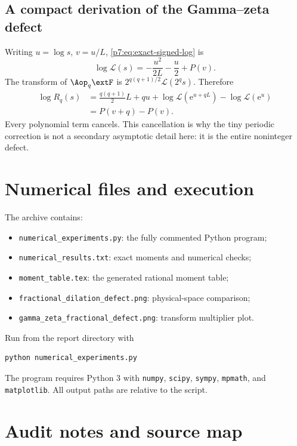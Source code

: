 \documentclass[11pt,oneside]{article}
\theoremstyle{definition}
\theoremstyle{remark}
\newcommand{\e}{\mathrm e}
\newcommand{\1}{\mathbf 1}
\begin{document}
\subsection{A compact derivation of the Gamma--zeta defect}

Writing $u=\log s$, $v=u/L$, \cref{p7:eq:exact-signed-log} is
\[
 \log\mathscr L(s)=-\frac{u^2}{2L}-\frac u2+P(v).
\]
The transform of $\Aop_q\extF$ is
$2^{q(q+1)/2}\mathscr L(2^qs)$.  Therefore
\begin{align*}
 \log R_q(s)
 &=\frac{q(q+1)}2L+qu
   +\log\mathscr L(\e^{u+qL})-\log\mathscr L(\e^u)\\
 &=P(v+q)-P(v).
\end{align*}
Every polynomial term cancels.  This cancellation is why the tiny periodic correction is not a
secondary asymptotic detail here: it is the entire noninteger defect.

\section{Numerical files and execution}
\label{p7:app:numerical-files}

The archive contains:
\begin{itemize}
\item \texttt{numerical\_experiments.py}: the fully commented Python program;
\item \texttt{numerical\_results.txt}: exact moments and numerical checks;
\item \texttt{moment\_table.tex}: the generated rational moment table;
\item \texttt{fractional\_dilation\_defect.png}: physical-space comparison;
\item \texttt{gamma\_zeta\_fractional\_defect.png}: transform multiplier plot.
\end{itemize}

Run from the report directory with
\begin{lstlisting}[language=bash]
python numerical_experiments.py
\end{lstlisting}
The program requires Python 3 with \texttt{numpy}, \texttt{scipy}, \texttt{sympy},
\texttt{mpmath}, and \texttt{matplotlib}.  All output paths are relative to the script.

\section{Audit notes and source map}
\label{p7:app:audit-map}
\end{document}
